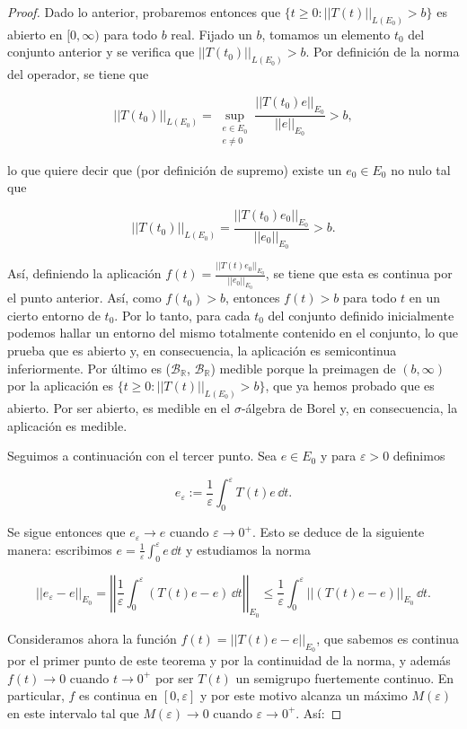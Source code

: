 \begin{proof}
    Dado lo anterior, probaremos entonces que $\{t \geq 0 : ||T(t)||_{L(E_0)} > b\}$ es abierto en $[0, \infty)$ para todo $b$ real. Fijado un $b$, tomamos un elemento $t_0$ del conjunto anterior y se verifica que $||T(t_0)||_{L(E_0)} > b$. Por definición de la norma del operador, se tiene que 
    
    \[||T(t_0)||_{L(E_0)} = \sup_{\substack{e \in E_0 \\ e \neq 0}}  \frac{||T(t_0)e||_{E_0}}{||e||_{E_0}}> b,\]

    lo que quiere decir que (por definición de supremo) existe un $e_0 \in E_0$ no nulo tal que 

    \[||T(t_0)||_{L(E_0)} = \frac{||T(t_0)e_0||_{E_0}}{||e_0||_{E_0}} > b.\]

    Así, definiendo la aplicación $f(t) = \frac{||T(t)e_0||_{E_0}}{||e_0||_{E_0}}$, se tiene que esta es continua por el punto anterior. Así, como $f(t_0) > b$, entonces $f(t) > b$ para todo $t$ en un cierto entorno de $t_0$. Por lo tanto, para cada $t_0$ del conjunto definido inicialmente podemos hallar un entorno del mismo totalmente contenido en el conjunto, lo que prueba que es abierto y, en consecuencia, la aplicación es semicontinua inferiormente. Por último es ($\mathcal{B}_{\mathbb{R}}$, $\mathcal{B}_{\mathbb{R}}$) medible porque la preimagen de $(b, \infty)$ por la aplicación es $\{t \geq 0 : ||T(t)||_{L(E_0)} > b\}$, que ya hemos probado que es abierto. Por ser abierto, es medible en el $\sigma$-álgebra de Borel y, en consecuencia, la aplicación es medible.

    Seguimos a continuación con el tercer punto. Sea $e \in E_0$ y para $\varepsilon > 0$ definimos

    \[e_{\varepsilon} := \frac{1}{\varepsilon}\int_0^{\varepsilon}T(t)e \, \dd t.\]

    Se sigue entonces que $e_{\varepsilon} \rightarrow e$ cuando $\varepsilon \rightarrow 0^+$. Esto se deduce de la siguiente manera: escribimos $e = \frac{1}{\varepsilon}\int_{0}^{\varepsilon}e \, \dd t$ y estudiamos la norma 
    
    \[||e_{\varepsilon} - e||_{E_0} = \left | \left | \frac{1}{\varepsilon}\int_0^{\varepsilon} (T(t)e -e ) \, \dd t \right | \right |_{E_0} \leq \frac{1}{\varepsilon} \int_0^{\varepsilon} ||(T(t)e - e)||_{E_0} \, \dd t.\]

    Consideramos ahora la función $f(t) = ||T(t)e - e||_{E_0}$, que sabemos es continua por el primer punto de este teorema y por la continuidad de la norma, y además $f(t) \rightarrow 0$ cuando $t \rightarrow 0^+$ por ser $T(t)$ un semigrupo fuertemente continuo. En particular, $f$ es continua en $[0,\varepsilon]$ y por este motivo alcanza un máximo $M(\varepsilon)$ en este intervalo tal que $M(\varepsilon) \rightarrow 0$ cuando $\varepsilon \rightarrow 0^+$. Así:


\end{proof}
